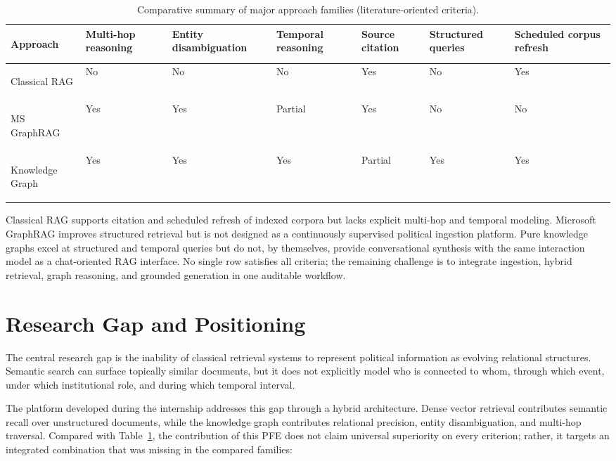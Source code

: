 \begin{table}[H]
\centering
\scriptsize
\renewcommand{\arraystretch}{1.25}
\begin{tabularx}{\textwidth}{@{}>{\bfseries\raggedright\arraybackslash}X >{\centering\arraybackslash}p{1.42cm} >{\centering\arraybackslash}p{1.42cm} >{\centering\arraybackslash}p{1.42cm} >{\centering\arraybackslash}p{1.42cm} >{\centering\arraybackslash}p{1.42cm} >{\centering\arraybackslash}p{1.42cm}@{}}
\toprule
\rowcolor{lightblue}
Approach & Multi-hop reasoning & Entity disambiguation & Temporal reasoning & Source citation & Structured queries & Scheduled corpus refresh \\
\midrule
Classical RAG & No & No & No & Yes & No & Yes \\
MS GraphRAG & Yes & Yes & Partial & Yes & No & No \\
Knowledge Graph & Yes & Yes & Yes & Partial & Yes & Yes \\
\bottomrule
\end{tabularx}
\caption{Comparative summary of major approach families (literature-oriented criteria).}
\label{tab:comparative-summary}
\end{table}

Classical RAG supports citation and scheduled refresh of indexed corpora but lacks explicit multi-hop and temporal modeling. Microsoft GraphRAG improves structured retrieval but is not designed as a continuously supervised political ingestion platform. Pure knowledge graphs excel at structured and temporal queries but do not, by themselves, provide conversational synthesis with the same interaction model as a chat-oriented RAG interface. No single row satisfies all criteria; the remaining challenge is to integrate ingestion, hybrid retrieval, graph reasoning, and grounded generation in one auditable workflow.

\section{Research Gap and Positioning}
\label{sec:research-gap-positioning}

The central research gap is the inability of classical retrieval systems to represent political information as evolving relational structures. Semantic search can surface topically similar documents, but it does not explicitly model who is connected to whom, through which event, under which institutional role, and during which temporal interval.

The platform developed during the internship addresses this gap through a hybrid architecture. Dense vector retrieval contributes semantic recall over unstructured documents, while the knowledge graph contributes relational precision, entity disambiguation, and multi-hop traversal. Compared with Table~\ref{tab:comparative-summary}, the contribution of this PFE does not claim universal superiority on every criterion; rather, it targets an integrated combination that was missing in the compared families:

